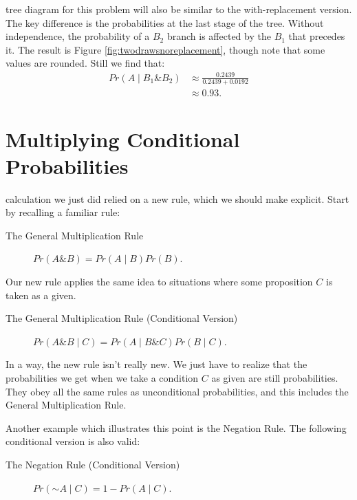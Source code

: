 \documentclass[justified]{tufte-book}
\newcommand{\given}{\mid}
\renewcommand{\neg}{\mathbin{\sim}}
\renewcommand{\wedge}{\mathbin{\&}}
\newcommand{\p}{Pr}
\theoremstyle{definition}
\theoremstyle{definition}
\theoremstyle{definition}
\theoremstyle{remark}
\begin{document}
 tree diagram for this problem will also be similar to
the with-replacement version. The key difference is the probabilities at
the last stage of the tree. Without independence, the probability of a
\(B_2\) branch is affected by the \(B_1\) that precedes it. The result
is Figure \ref{fig:twodrawsnoreplacement}, though note that some values
are rounded. Still we find that: \[
  \begin{aligned}
     \p(A \given B_1 \wedge B_2) &\approx \frac{ 0.2439 }{ 0.2439 + 0.0192 } \\
                                 &\approx 0.93.
  \end{aligned}
\]

\hypertarget{multiplying-conditional-probabilities}{%
\section{Multiplying Conditional
Probabilities}\label{multiplying-conditional-probabilities}}

 calculation we just did relied on a new rule, which we
should make explicit. Start by recalling a familiar rule:

\begin{description}
\item[The General Multiplication Rule]
\(\p(A \wedge B) = \p(A \given B) \p(B).\)
\end{description}

Our new rule applies the same idea to situations where some proposition
\(C\) is taken as a given.

\begin{description}
\item[The General Multiplication Rule (Conditional Version)]
\(\p(A \wedge B \given C) = \p(A \given B \wedge C) \p(B \given C).\)
\end{description}

In a way, the new rule isn't really new. We just have to realize that
the probabilities we get when we take a condition \(C\) as given are
still probabilities. They obey all the same rules as unconditional
probabilities, and this includes the General Multiplication Rule.

Another example which illustrates this point is the Negation Rule. The
following conditional version is also valid:

\begin{description}
\item[The Negation Rule (Conditional Version)]
\(\p(\neg A \given C) = 1 - \p(A \given C).\)
\end{description}
\end{document}
